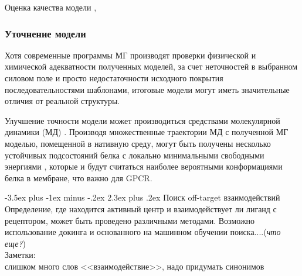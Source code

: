 \documentclass[a4paper,14pt]{extreport}
\makeatletter
\renewcommand{\section}{\@startsection{section}{1}{0pt}%
	{-3.5ex plus -1ex minus -.2ex}%
	{2.3ex plus .2ex}%
	{\centering\hyphenpenalty=10000\normalfont\Large\bfseries}}
\makeatother
\begin{document}
	Оценка качества модели \cite{DOPEShen2006}, 
	\subsubsection{Уточнение модели}
	Хотя современные программы МГ производят проверки физической и химической адекватности полученных моделей, за счет неточностей в выбранном силовом поле и просто недостаточности исходного покрытия последовательностями шаблонами, итоговые модели могут иметь значительные отличия от реальной структуры. 
	
	Улучшение точности модели может производиться средствами молекулярной динамики (МД) \cite{Nowroozi}. Производя множественные траектории МД с полученной МГ моделью, помещенной в нативную среду, могут быть получены несколько устойчивых подсостояний белка с локально минимальными свободными энергиями%
	, которые и будут считаться наиболее вероятными конформациями белка в мембране, что важно для GPCR.
	
	\section{Поиск off-target взаимодействий}
	Определение, где находится активный центр и взаимодействует ли лиганд с рецептором, может быть проведено различными методами. Возможно использование докинга
	\cite{Pradeep2012} и основанного на машинном обучении поиска....(\textit{что еще?})
	\\
	
	Заметки:\\
	слишком много слов <<взаимодействие>>, надо придумать синонимов 
	
	
\end{document}
